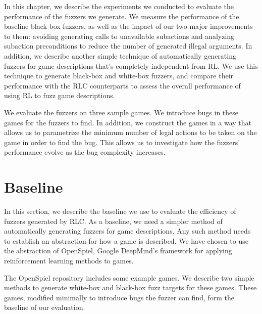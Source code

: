 In this chapter, we describe the experiments we conducted to evaluate the performance of the fuzzers we generate.
We measure the performance of the baseline black-box fuzzers, as well as the impact of our two major improvements to them: 
    avoiding generating calls to unavailable subactions and analyzing subaction preconditions to reduce the number of generated illegal arguments.
In addition, we describe another simple technique of automatically generating fuzzers for game descriptions that's completely independent from RL.
We use this technique to generate black-box and white-box fuzzers, and compare their performance with the RLC counterparts to assess the overall performance of using RL
    to fuzz game descriptions.

We evaluate the fuzzers on three sample games.
We introduce bugs in these games for the fuzzers to find.
In addition, we construct the games in a way that allows us to parametrize the minimum number of legal actions to be taken on the game in order to find the bug.
This allows us to investigate how the fuzzers' performance evolve as the bug complexity increases.

\section{Baseline}
In this section, we describe the baseline we use to evaluate the efficiency of fuzzers generated by RLC.
As a baseline, we need a simpler method of automatically generating fuzzers for game descriptions. Any such method
needs to establish an abstraction for how a game is described. We have chosen to use the abstraction of OpenSpiel, 
Google DeepMind's framework for applying reinforcement learning methods to games.

The OpenSpiel repository includes some example games. We describe two simple methods to generate white-box and black-box fuzz targets for these games.
These games, modified minimally to introduce bugs the fuzzer can find, form the baseline of our evaluation.

